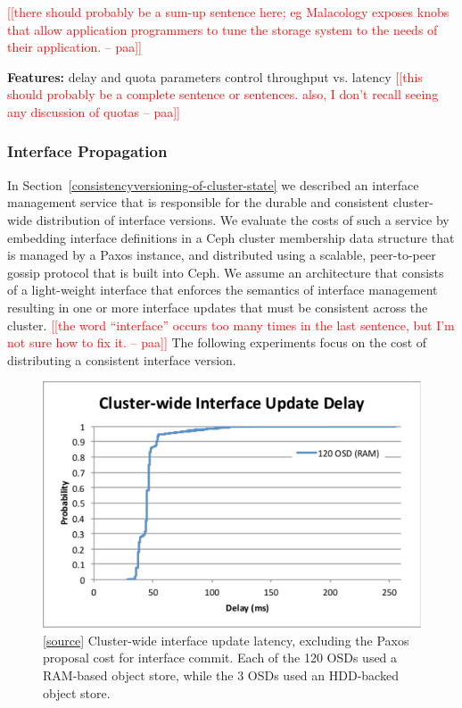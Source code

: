 \documentclass[preprint]{sigplanconf-eurosys}
\newcommand{\paa}[1]{{\textcolor{red}{[[#1 -- paa]]}}}
\begin{document}
\paa{there should probably be a sum-up sentence here; eg Malacology exposes knobs that
allow application programmers to tune the storage system to the needs of their application.}

\noindent\textbf{Features:} delay and quota parameters control throughput vs.
latency
\paa{this should probably be a complete sentence or sentences.  also, I don't recall
seeing any discussion of quotas}

\subsubsection{Interface Propagation}

In Section~\ref{consistencyversioning-of-cluster-state} we described an
interface management service that is responsible for the durable and
consistent cluster-wide distribution of interface versions. We evaluate the
costs of such a service by embedding interface definitions in a Ceph cluster
membership data structure that is managed by a Paxos instance, and distributed
using a scalable, peer-to-peer gossip protocol that is built into Ceph. We
assume an architecture that consists of a light-weight interface that enforces
the semantics of interface management resulting in one or more interface
updates that must be consistent across the cluster. \paa{the word ``interface''
occurs too many times in the last sentence, but I'm not sure how to fix it.}
The following experiments
focus on the cost of distributing a consistent interface version.

\begin{figure}[h]
\centering
\includegraphics[trim={1 4 4 1.3cm},clip]{figures/iface-update-delay.pdf}
\caption{[\href{https://github.com/double-blind-submitter/osdi16}{source}]
Cluster-wide interface update latency, excluding the Paxos proposal cost for
interface commit. Each of the 120 OSDs used a RAM-based object store, while the
3 OSDs used an HDD-backed object store.}
\label{fig:propdelay}
\end{figure}
\end{document}
